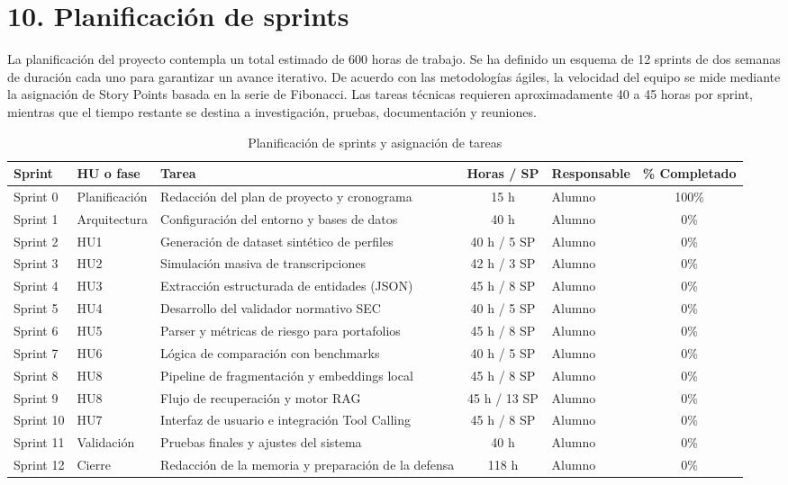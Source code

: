 \documentclass[
11pt, %
]{charter}
\begin{document}
\section{10. Planificación de sprints}
\label{sec:sprints}

La planificación del proyecto contempla un total estimado de 600 horas de trabajo. Se ha definido un esquema de 12 sprints de dos semanas de duración cada uno para garantizar un avance iterativo. De acuerdo con las metodologías ágiles, la velocidad del equipo se mide mediante la asignación de Story Points basada en la serie de Fibonacci. Las tareas técnicas requieren aproximadamente 40 a 45 horas por sprint, mientras que el tiempo restante se destina a investigación, pruebas, documentación y reuniones.

\begin{table}[!ht] %
\centering
\caption{Planificación de sprints y asignación de tareas}
\begin{tabularx}{\linewidth}{@{}|l|l|X|c|l|c|@{}}
\hline
\rowcolor[HTML]{C0C0C0}
Sprint & HU o fase & Tarea & Horas / SP & Responsable & \% Completado \\ \hline
Sprint 0 & Planificación & Redacción del plan de proyecto y cronograma & 15 h & Alumno & 100\% \\ \hline
Sprint 1 & Arquitectura & Configuración del entorno y bases de datos & 40 h & Alumno & 0\% \\ \hline
Sprint 2 & HU1 & Generación de dataset sintético de perfiles & 40 h / 5 SP & Alumno & 0\% \\ \hline
Sprint 3 & HU2 & Simulación masiva de transcripciones & 42 h / 3 SP & Alumno & 0\% \\ \hline
Sprint 4 & HU3 & Extracción estructurada de entidades (JSON) & 45 h / 8 SP & Alumno & 0\% \\ \hline
Sprint 5 & HU4 & Desarrollo del validador normativo SEC & 40 h / 5 SP & Alumno & 0\% \\ \hline
Sprint 6 & HU5 & Parser y métricas de riesgo para portafolios & 45 h / 8 SP & Alumno & 0\% \\ \hline
Sprint 7 & HU6 & Lógica de comparación con benchmarks & 40 h / 5 SP & Alumno & 0\% \\ \hline
Sprint 8 & HU8 & Pipeline de fragmentación y embeddings local & 45 h / 8 SP & Alumno & 0\% \\ \hline
Sprint 9 & HU8 & Flujo de recuperación y motor RAG & 45 h / 13 SP & Alumno & 0\% \\ \hline
Sprint 10 & HU7 & Interfaz de usuario e integración Tool Calling & 45 h / 8 SP & Alumno & 0\% \\ \hline
Sprint 11 & Validación & Pruebas finales y ajustes del sistema & 40 h & Alumno & 0\% \\ \hline
Sprint 12 & Cierre & Redacción de la memoria y preparación de la defensa & 118 h & Alumno & 0\% \\ \hline
\end{tabularx}
\end{table}
\end{document}
